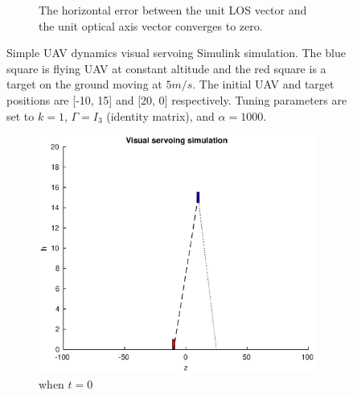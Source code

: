 \begin{figure}
\begin{subfigure}[b]{0.8\linewidth}
		\caption{The horizontal error between the unit LOS vector and the unit optical axis vector converges to zero.}
	\end{subfigure}	
	\caption{Simple UAV dynamics visual servoing Simulink simulation. The blue square is flying UAV at constant altitude and the red square is a target on the ground moving at $5m/s$. The initial UAV and target positions are [-10, 15] and [20, 0] respectively. Tuning parameters are set to $k=1$, $\Gamma=I_3$ (identity matrix), and $\alpha=1000$.}
	\label{simple_simulation}
\end{figure}

\begin{figure}
	\centering
	\begin{subfigure}[b]{0.45\linewidth}
		\includegraphics[width=\textwidth]{images/chapter4/another_simple_zero}
		\caption{when $t=0$}
	\end{subfigure}
	~ %
	\begin{subfigure}[b]{0.45\linewidth}

\end{subfigure}
\end{figure}
